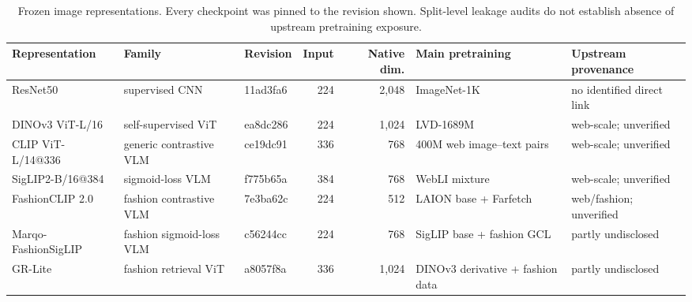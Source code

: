 \begin{table}[t]
\caption{Frozen image representations. Every checkpoint was pinned to the revision shown. Split-level leakage audits do not establish absence of upstream pretraining exposure.}
\label{tab:representations}
\centering
\scriptsize
\begin{tabular}{l l l r r l l}
\toprule
Representation & Family & Revision & Input & Native dim. & Main pretraining & Upstream provenance \\
\midrule
ResNet50 & supervised CNN & 11ad3fa6 & 224 & 2,048 & ImageNet-1K & no identified direct link \\
DINOv3 ViT-L/16 & self-supervised ViT & ea8dc286 & 224 & 1,024 & LVD-1689M & web-scale; unverified \\
CLIP ViT-L/14@336 & generic contrastive VLM & ce19dc91 & 336 & 768 & 400M web image--text pairs & web-scale; unverified \\
SigLIP2-B/16@384 & sigmoid-loss VLM & f775b65a & 384 & 768 & WebLI mixture & web-scale; unverified \\
FashionCLIP 2.0 & fashion contrastive VLM & 7e3ba62c & 224 & 512 & LAION base + Farfetch & web/fashion; unverified \\
Marqo-FashionSigLIP & fashion sigmoid-loss VLM & c56244cc & 224 & 768 & SigLIP base + fashion GCL & partly undisclosed \\
GR-Lite & fashion retrieval ViT & a8057f8a & 336 & 1,024 & DINOv3 derivative + fashion data & partly undisclosed \\
\bottomrule
\end{tabular}
\end{table}
